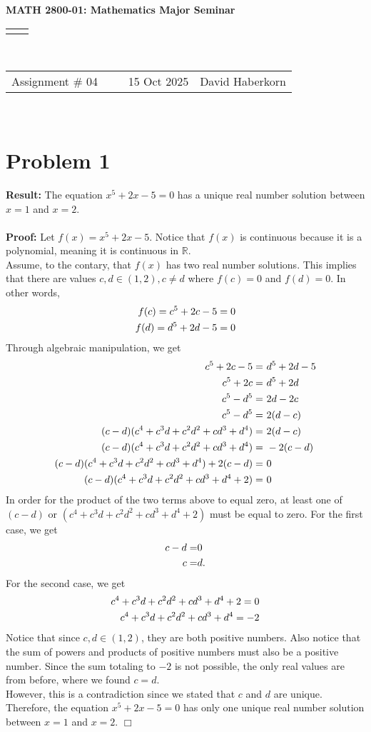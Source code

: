 \documentclass[11pt]{article}
\renewcommand{\title}[1]{\textbf{#1}\\}
\renewcommand{\line}{\begin{tabularx}{\textwidth}{X>{\raggedleft}X}\hline\\\end{tabularx}\\[-0.5cm]}
\newcommand{\leftright}[2]{\begin{tabularx}{\textwidth}{X>{\raggedleft}X}#1%
& #2\\\end{tabularx}\\[-0.5cm]}
\begin{document}
\title{MATH 2800-01: Mathematics Major Seminar}
\line
\leftright{Assignment \# 04 ~~~~ 15 Oct 2025}{David Haberkorn}


\section*{Problem 1}

    \textbf{Result:} The equation $x^5 + 2x - 5 = 0$ has a unique real number solution between $x=1$ and $x=2$.\\
    \\
    \textbf{Proof:} Let $f(x) = x^5 + 2x - 5$. Notice that $f(x)$ is continuous because it is a polynomial, meaning it is continuous in $\mathbb{R}$. \\
    Assume, to the contary, that $f(x)$ has two real number solutions. This implies that there are values $c,d \in (1,2), c \neq d$ where $f(c) = 0$ and $f(d) = 0$. In other words,
    \begin{align}
        f(c) = c^5 + 2c - 5 = 0 \notag \\
        f(d) = d^5 + 2d - 5 = 0 \notag
    \end{align}
    Through algebraic manipulation, we get
    \begin{align}
        c^5 + 2c - 5 =& \ d^5 + 2d - 5 \notag \\
        c^5 + 2c =& \ d^5 + 2d \notag \\
        c^5 - d^5 =& \ 2d - 2c \notag \\
        c^5 - d^5 =& \ 2(d-c) \notag \\
        (c - d)(c^4 + c^3d + c^2d^2 + cd^3 + d^4) =& \ 2(d-c) \notag \\
        (c - d)(c^4 + c^3d + c^2d^2 + cd^3 + d^4) =& \ -2(c-d) \notag \\
        (c - d)(c^4 + c^3d + c^2d^2 + cd^3 + d^4) + 2(c-d)=& \ 0 \notag \\
        (c - d)(c^4 + c^3d + c^2d^2 + cd^3 + d^4 + 2) =& \ 0 \notag
    \end{align}
    In order for the product of the two terms above to equal zero, at least one of $(c-d)$ or $(c^4 + c^3d + c^2d^2 + cd^3 + d^4 + 2)$ must be equal to zero. For the first case, we get
    \begin{align}
        c-d =& 0 \notag \\
        c =& d . \notag
    \end{align}
    For the second case, we get
    \begin{align}
        c^4 + c^3d + c^2d^2 + cd^3 + d^4 + 2 = 0 \notag \\
        c^4 + c^3d + c^2d^2 + cd^3 + d^4 = -2 \notag
    \end{align}
    Notice that since $c,d \in (1,2)$, they are both positive numbers. Also notice that the sum of powers and products of positive numbers must also be a positive number. Since the sum totaling to $-2$ is not possible, the only real values are from before, where we found $c=d$.\\
    However, this is a contradiction since we stated that $c$ and $d$ are unique. Therefore, the equation $x^5 + 2x - 5 = 0$ has only one unique real number solution between $x=1$ and $x=2$. \hfill $\Box$
\end{document}
